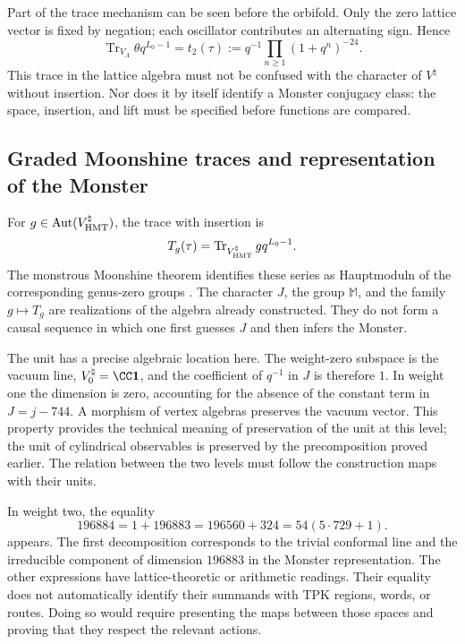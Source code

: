Part of the trace mechanism can be seen before the orbifold.
Only the zero lattice vector is fixed by negation; each
oscillator contributes an alternating sign. Hence
\[
 \operatorname{Tr}_{V_\Lambda}\theta q^{L_0-1}
   =t_2(\tau)
   :=q^{-1}\prod_{n\geq1}(1+q^n)^{-24}.
\]
This trace in the lattice algebra must not be confused with the
character of $V^\natural$ without insertion. Nor does it by
itself identify a Monster conjugacy class: the space, insertion,
and lift must be specified before functions are compared.

\subsection{Graded Moonshine traces and representation of the Monster}
\label{exc:alcance}

For $g\in\operatorname{Aut}(V^\natural_{\rm HMT})$, the trace
with insertion is
\[
 T_g(\tau)=
 \operatorname{Tr}_{V^\natural_{\rm HMT}}gq^{L_0-1}.
\]
The monstrous Moonshine theorem identifies these series as
Hauptmoduln of the corresponding genus-zero groups
\cite[Theorem~1.1]{borcherds}.
The character $J$, the group $\mathbb M$, and the family $g\mapsto T_g$
are realizations of the algebra already constructed. They do not form a causal
sequence in which one first guesses $J$ and then infers the Monster.

The unit has a precise algebraic location here. The weight-zero
subspace is the vacuum line, \(V^\natural_0=\CC\mathbf1\), and
the coefficient of \(q^{-1}\) in \(J\) is therefore \(1\). In weight one
the dimension is zero, accounting for the absence of the constant term
in \(J=j-744\). A morphism of vertex algebras preserves the vacuum
vector. This property provides the technical meaning of preservation
of the unit at this level; the unit of cylindrical observables
is preserved by the precomposition proved earlier. The relation
between the two levels must follow the construction maps with their units.

In weight two, the equality
\[
 196884=1+196883=196560+324=54(5\cdot729+1).
\]
appears. The first decomposition corresponds to the trivial conformal line and the
irreducible component of dimension $196883$ in the Monster
representation. The other expressions have lattice-theoretic or
arithmetic readings. Their equality does not automatically identify their summands
with TPK regions, words, or routes. Doing so would require
presenting the maps between those spaces and proving that they respect the
relevant actions.

